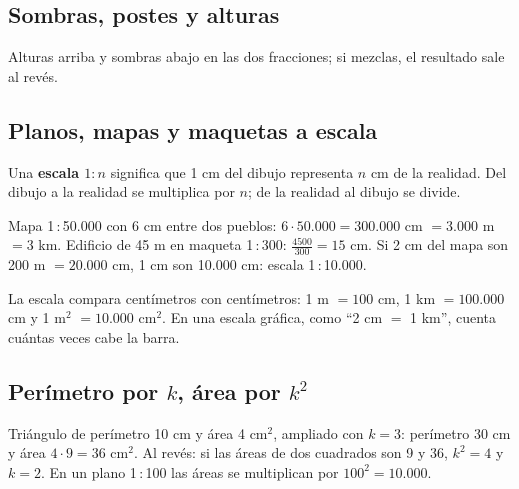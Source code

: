 \subsection{Sombras, postes y alturas}
\begin{ojo} Alturas arriba y sombras abajo en las dos fracciones; si mezclas, el resultado sale al revés.\end{ojo}

\subsection{Planos, mapas y maquetas a escala}
Una \textbf{escala $1 : n$} significa que 1 cm del dibujo representa $n$ cm de la realidad. Del dibujo a la realidad se multiplica por $n$; de la realidad al dibujo se divide.
\begin{ejemplo} Mapa 1\,:\,50.000 con 6 cm entre dos pueblos: $6 \cdot 50.000 = 300.000$ cm $= 3.000$ m $= 3$ km. Edificio de 45 m en maqueta 1\,:\,300: $\frac{4500}{300} = 15$ cm. Si 2 cm del mapa son 200 m $= 20.000$ cm, 1 cm son 10.000 cm: escala 1\,:\,10.000.\end{ejemplo}
\begin{ojo} La escala compara centímetros con centímetros: 1 m $= 100$ cm, 1 km $= 100.000$ cm y 1 m$^2$ $= 10.000$ cm$^2$. En una escala gráfica, como ``2 cm $=$ 1 km'', cuenta cuántas veces cabe la barra.\end{ojo}

\subsection{\texorpdfstring{Perímetro por $k$, área por $k^2$}{Perímetro por k, área por k al cuadrado}}
\begin{ejemplo} Triángulo de perímetro 10 cm y área 4 cm$^2$, ampliado con $k = 3$: perímetro 30 cm y área $4 \cdot 9 = 36$ cm$^2$. Al revés: si las áreas de dos cuadrados son 9 y 36, $k^2 = 4$ y $k = 2$. En un plano 1\,:\,100 las áreas se multiplican por $100^2 = 10.000$.\end{ejemplo}

